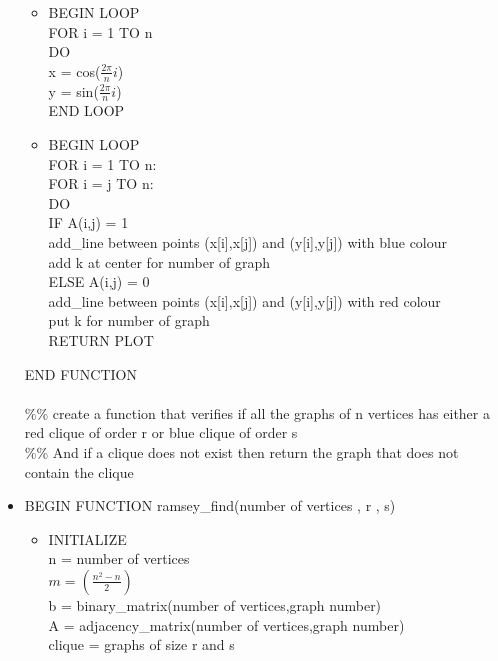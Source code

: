 \documentclass{Assignment}
\begin{document}
\begin{itemize}
\begin{itemize}
	\item BEGIN LOOP\\
	FOR i = 1 TO n\\
	\hspace*{0.5cm} DO\\
	\hspace*{0.5cm} x = cos($\frac{2\pi}{n}i$)\\
	\hspace*{0.5cm}	y = sin($\frac{2\pi}{n}i$)\\
	END LOOP
	\item \hspace*{0.2cm} BEGIN LOOP\\
	\hspace*{0.5cm} FOR i = 1 TO n:\\
	\hspace*{0.5cm} FOR i = j TO n:\\
	\hspace*{0.5cm} DO\\
	\hspace*{1cm} IF A(i,j) = 1\\
\hspace*{1.5cm}	add\_line between points (x[i],x[j]) and (y[i],y[j]) with blue colour\\
\hspace*{1.5cm} add k at center for number of graph\\
\hspace*{1cm}	ELSE  A(i,j) = 0\\
\hspace*{1.5cm}	add\_line between points (x[i],x[j]) and (y[i],y[j]) with red colour\\
	\hspace*{1.5cm} put k for number of graph\\
RETURN PLOT\\
\end{itemize}
END FUNCTION\\\\
\%\% create a function that verifies if all the graphs of n vertices has either a red clique of order r or blue clique of order s\\
\%\% And if a clique does not exist then return the graph that does not contain the clique
\item BEGIN FUNCTION ramsey\_find(number of vertices , r , s)
\begin{itemize}
\item
INITIALIZE\\
n = number of vertices \\
$m = \left(\frac{n^2-n}{2}\right)$ \\
b = binary\_matrix(number of vertices,graph number)\\
A = adjacency\_matrix(number of vertices,graph number)\\
clique = graphs of size r and s 


\end{itemize}
\end{itemize}
\end{document}
